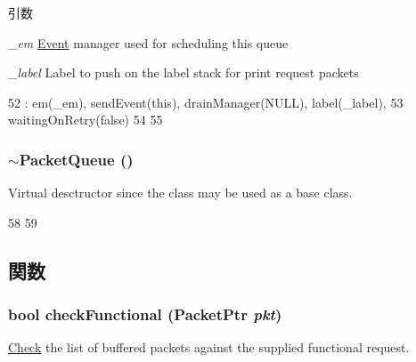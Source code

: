 \begin{DoxyParams}{引数}
\item[{\em \_\-em}]\hyperlink{classEvent}{Event} manager used for scheduling this queue \item[{\em \_\-label}]Label to push on the label stack for print request packets \end{DoxyParams}



\begin{DoxyCode}
52     : em(_em), sendEvent(this), drainManager(NULL), label(_label),
53       waitingOnRetry(false)
54 {
55 }
\end{DoxyCode}
\hypertarget{classPacketQueue_a3efbe442356f38106e0b67f41070245a}{
\subsubsection[{$\sim$PacketQueue}]{\setlength{\rightskip}{0pt plus 5cm}$\sim${\bf PacketQueue} ()}}
\label{classPacketQueue_a3efbe442356f38106e0b67f41070245a}
Virtual desctructor since the class may be used as a base class. 


\begin{DoxyCode}
58 {
59 }
\end{DoxyCode}


\subsection{関数}
\hypertarget{classPacketQueue_a8eb60d4744b6212ad749f3a586759266}{
\subsubsection[{checkFunctional}]{\setlength{\rightskip}{0pt plus 5cm}bool checkFunctional ({\bf PacketPtr} {\em pkt})}}
\label{classPacketQueue_a8eb60d4744b6212ad749f3a586759266}
\hyperlink{classCheck}{Check} the list of buffered packets against the supplied functional request. 


